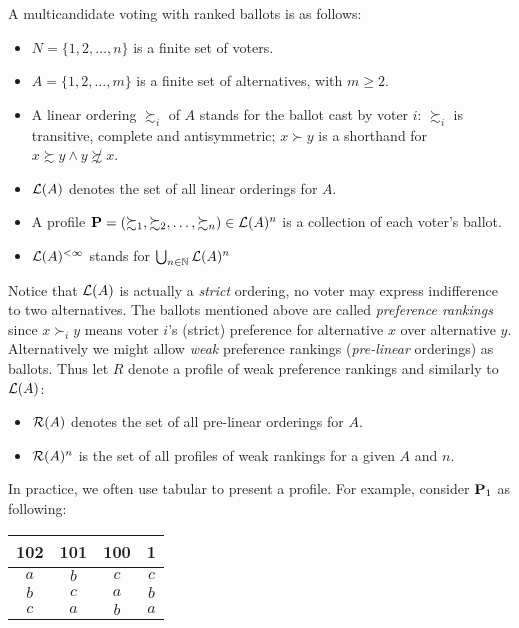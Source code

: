 A multicandidate voting with ranked ballots is as follows:
\begin{itemize}
    \item $N = \{1,2, \dots, n\}$ is a finite set of voters.
    \item $A = \{1,2, \dots, m\}$ is a finite set of alternatives, with $m \geq 2$.
    \item A linear ordering $\succsim_i$ of $A$ stands for the ballot cast by voter $i$: $\succsim_i$ is transitive, complete and antisymmetric; $x \succ y$ is a shorthand for $x \succsim y \land y \not \succsim x$.
    \item $\mathcal{L}(A)$ denotes the set of all linear orderings for $A$.
    \item A profile $\mathbf{P} = (\succsim_1,\succsim_2,\dots,\succsim_n) \in \mathcal{L}(A)^n $ is a collection of each voter's ballot.
    \item $\mathcal{L}(A)^{<\infty}$ stands for $\bigcup_{n \in \mathbb{N}} \mathcal{L}(A)^n$
\end{itemize}

Notice that $\mathcal{L}(A)$ is actually a \textit{strict} ordering, no voter may express indifference to two alternatives. The ballots mentioned above are called \textit{preference rankings} since $x \succ_i y$ means voter $i$'s (strict) preference for alternative $x$ over alternative $y$.\\
Alternatively we might allow \textit{weak} preference rankings (\textit{pre-linear} orderings) as ballots. Thus let $R$ denote a profile of weak preference rankings and similarly to $\mathcal{L}(A)$:
\begin{itemize}
    \item $\mathcal{R}(A)$ denotes the set of all pre-linear orderings for $A$.
    \item $\mathcal{R}(A)^n$ is the set of all profiles of weak rankings for a given $A$ and $n$.
\end{itemize}

In practice, we often use tabular to present a profile. For example, consider $\mathbf{P}_1$ as following:
\begin{center}
    \begin{tabular}{cccc}
        102 & 101 & 100 & 1\\
        \hline
        $a$ & $b$ & $c$ & $c$\\
        $b$ & $c$ & $a$ & $b$\\
        $c$ & $a$ & $b$ & $a$
    \end{tabular}
\end{center}

